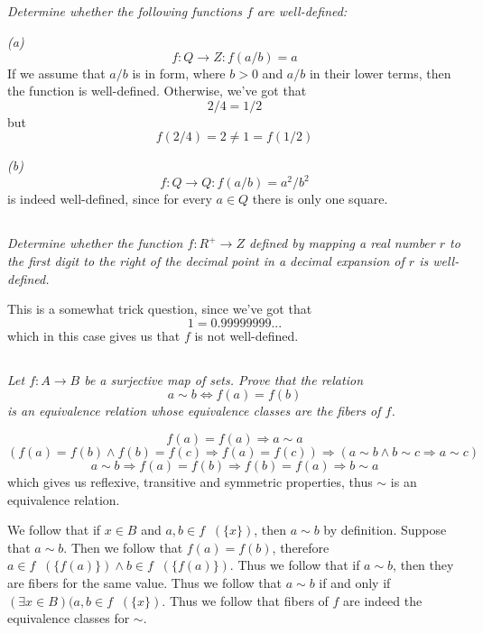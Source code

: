 \documentclass[11pt,oneside,titlepage]{book}
\DeclareMathOperator \inv {^{-1}}
\DeclareMathOperator \lra {\Leftrightarrow}
\DeclareMathOperator \ra {\Rightarrow}
\begin{document}
\subsection{}

\textit{Determine whether the following functions $f$ are well-defined: }

\textit{(a)}
$$f: Q \to Z: f(a/b) = a$$
If we assume that $a/b$ is in form, where $b > 0$ and $a/b$ in their lower terms, then the
function is well-defined. Otherwise, we've got that
$$2/4 = 1/2$$
but
$$f(2/4) = 2 \neq 1 = f(1/2)$$

\textit{(b)}
$$f: Q \to Q: f(a/b) = a^2/b^2$$
is indeed well-defined, since for every $a \in Q$ there is only one square.

\subsection{}
\textit{Determine whether the function $f: R^+ \to Z$ defined by mapping a real number $r$
  to the first digit to the right of the decimal point in a decimal expansion of $r$ is
  well-defined.}

This is a somewhat trick question, since we've got that
$$1 = 0.99999999...$$
which in this case gives us that $f$ is not well-defined.

\subsection{}

\textit{Let $f: A \to B$ be a surjective map of sets. Prove that the relation
  $$a \sim b \lra f(a) = f(b)$$
  is an equivalence relation whose equivalence classes are the fibers of $f$.}

$$f(a) = f(a) \ra a \sim a$$
$$(f(a) = f(b) \land f(b) = f(c) \ra f(a) = f(c)) \ra (a \sim b \land b \sim c \ra a \sim c )$$
$$a \sim b \ra f(a) = f(b) \ra f(b) = f(a) \ra b \sim a$$
which gives us reflexive, transitive and symmetric properties, thus $\sim$ is an
equivalence relation.

We follow that if $x \in B$ and $a, b \in f\inv(\{x\})$, then $a \sim b$ by definition.
Suppose that $a \sim b$. Then we follow that $f(a) = f(b)$, therefore
$a \in f\inv(\{f(a)\}) \land b \in f\inv(\{f(a)\})$. Thus we follow that
if $a \sim b$, then they are fibers for the same value.
Thus we follow that $a \sim b$ if and only if $(\exists x \in B)( a, b \in f\inv(\{x\})$.
Thus we follow that fibers of $f$ are indeed the equivalence classes for $\sim$.
\end{document}
